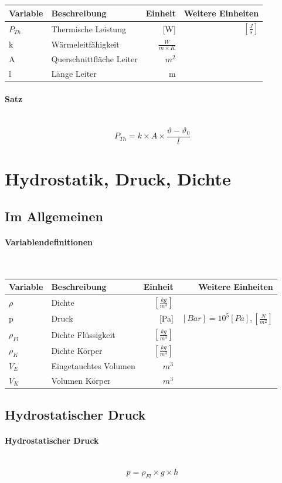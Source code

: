 \documentclass[a4paper,10pt]{article}
\newcommand{\lbparagraph}[1]{\paragraph{#1}\mbox{}\\}
\begin{document}
\begin{tabular}{l|l|r|r}
    Variable & Beschreibung & Einheit & Weitere Einheiten \\
    \hline
    $P_{Th}$ & Thermische Leistung & [W] & $[\frac{J}{s}]$ \\
    k & Wärmeleitfähigkeit & $\frac{W}{m \times K}$ & \\
    A & Querschnittfläche Leiter & $m^2$ & \\
    l & Länge Leiter & m &
\end{tabular}

\lbparagraph{Satz}

\begin{equation}
    P_{Th} = k \times A \times \frac{\vartheta - {\vartheta}_0}{l}
\end{equation}

\section{Hydrostatik, Druck, Dichte}

\subsection{Im Allgemeinen}

\lbparagraph{Variablendefinitionen}

\begin{tabular}{l|l|r|r}
    Variable & Beschreibung & Einheit & Weitere Einheiten \\
    \hline
    $\rho$ & Dichte & $[\frac{kg}{m^3}]$ & \\
    p & Druck & [Pa] & $[Bar] =10^5 [Pa], [\frac{N}{m^2}]$ \\
    ${\rho}_{Fl}$ & Dichte Flüssigkeit & $[\frac{kg}{m^3}]$ & \\
    ${\rho}_K$ & Dichte Körper & $[\frac{kg}{m^3}]$ & \\
    $V_E$ & Eingetauchtes Volumen & $m^3$ & \\
    $V_K$ & Volumen Körper & $m^3$ &
\end{tabular}

\subsection{Hydrostatischer Druck}

\lbparagraph{Hydrostatischer Druck}

\begin{equation}
    p = {\rho}_{Fl} \times g \times h
\end{equation}
\end{document}
